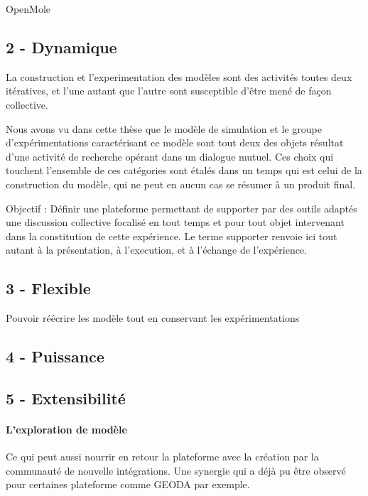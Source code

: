 OpenMole 



\subsection{2 - Dynamique}

La construction et l'experimentation des modèles sont des activités toutes deux itératives, et l'une autant que l'autre sont susceptible d'être mené de façon collective.

Nous avons vu dans cette thèse que le modèle de simulation et le groupe d'expérimentations caractérisant ce modèle sont tout deux des objets résultat d'une activité de recherche opérant dans un dialogue mutuel. Ces choix qui touchent l'ensemble de ces catégories sont étalés dans un temps qui est celui de la construction du modèle, qui ne peut en aucun cas se résumer à un produit final. 



Objectif : Définir une plateforme permettant de supporter par des outils adaptés une discussion collective focalisé en tout temps et pour tout objet intervenant dans la constitution de cette expérience. Le terme supporter renvoie ici tout autant à la présentation, à l'execution, et à l'échange de l'expérience.


\subsection{3 - Flexible}

Pouvoir réécrire les modèle tout en conservant les expérimentations

\subsection{4 - Puissance}

\subsection{5 - Extensibilité}


\paragraph{L'exploration de modèle}

Ce qui peut aussi nourrir en retour la plateforme avec la création par la communauté de nouvelle intégrations. Une synergie qui a déjà pu être observé pour certaines plateforme comme GEODA \autocite{Anselin} par exemple.

\printbibliography[heading=subbibliography]

\stopcontents[chapters]